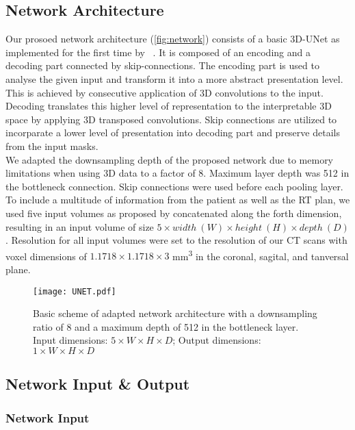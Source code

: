 \subsection{Network Architecture}

Our prosoed network architecture (\autoref{fig:network}) consists of a basic 3D-UNet as implemented for the first time by \citeauthor{ronneberger_u-net_2015-1}~\cite{ronneberger_u-net_2015-1}.
It is composed of an encoding and a decoding part connected by skip-connections.
The encoding part is used to analyse the given input and transform it into a more abstract presentation level. 
This is achieved by consecutive application of 3D convolutions to the input.
Decoding translates this higher level of representation to the interpretable 3D space by applying 3D transposed convolutions.
Skip connections are utilized to incorparate a lower level of presentation into decoding part and preserve details from the input masks.\\
We adapted the downsampling depth of the proposed network due to memory limitations when using 3D data to a factor of 8. 
Maximum layer depth was 512 in the bottleneck connection. 
Skip connections were used before each pooling layer. 
To include a multitude of information from the patient as well as the \acs{RT} plan, we used five input volumes as proposed by \cite{kontaxis_deepdose_2020} concatenated along the forth dimension, resulting in an input volume of size $5 \times width \ (W) \times height \ (H) \times depth \ (D)$.
Resolution for all input volumes were set to the resolution of our CT scans with voxel dimensions of $1.1718 \times 1.1718 \times 3$ mm\textsuperscript{3} in the coronal, sagital, and tanversal plane. 


\begin{figure}[!b]
    \centering
    \texttt{[image: UNET.pdf]}
    \caption{Basic scheme of adapted network architecture with a downsampling ratio of 8 and a maximum depth of 512 in the bottleneck layer. Input dimensions: $5 \times W \times H \times D$; Output dimensions: $1 \times W \times H \times D$}\label{fig:network}
\end{figure}

\subsection{Network Input \& Output}

\subsubsection{Network Input}

